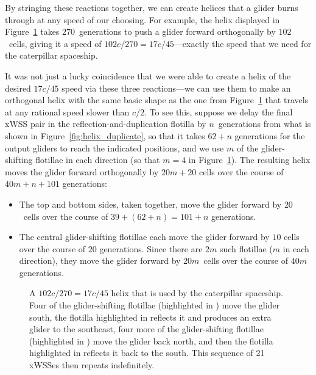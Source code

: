 By stringing these reactions together, we can create helices that a glider burns through at any speed of our choosing. For example, the helix displayed in Figure~\ref{fig:caterpillar_helix} takes $270$~generations to push a glider forward orthogonally by $102$~cells, giving it a speed of $102c/270 = 17c/45$---exactly the speed that we need for the caterpillar spaceship.

It was not just a lucky coincidence that we were able to create a helix of the desired $17c/45$ speed via these three reactions---we can use them to make an orthogonal helix with the same basic shape as the one from Figure~\ref{fig:caterpillar_helix} that travels at any rational speed slower than $c/2$. To see this, suppose we delay the final xWSS pair in the reflection-and-duplication flotilla by $n$~generations from what is shown in Figure~\ref{fig:helix_duplicate}, so that it takes $62 + n$ generations for the output gliders to reach the indicated positions, and we use $m$ of the glider-shifting flotillae in each direction (so that $m = 4$ in Figure~\ref{fig:caterpillar_helix}). The resulting helix moves the glider forward orthogonally by $20m + 20$ cells over the course of $40m + n + 101$ generations:\smallskip

\begin{itemize}
	\item The top and bottom sides, taken together, move the glider forward by $20$~cells over the course of $39 + (62 + n) = 101 + n$ generations.\smallskip
	
	\item The central glider-shifting flotillae each move the glider forward by $10$ cells over the course of $20$ generations. Since there are $2m$ such flotillae ($m$ in each direction), they move the glider forward by $20m$~cells over the course of $40m$ generations.\smallskip
\end{itemize}

\begin{figure}[!htb]
\centering
{}
\caption{A $102c/270 = 17c/45$ helix that is used by the caterpillar spaceship. Four of the glider-shifting flotillae (highlighted in ) move the glider south, the flotilla highlighted in  reflects it and produces an extra glider to the southeast, four more of the glider-shifting flotillae (highlighted in ) move the glider back north, and then the flotilla highlighted in  reflects it back to the south. This sequence of 21 xWSSes then repeats indefinitely.}\label{fig:caterpillar_helix}
\end{figure}


